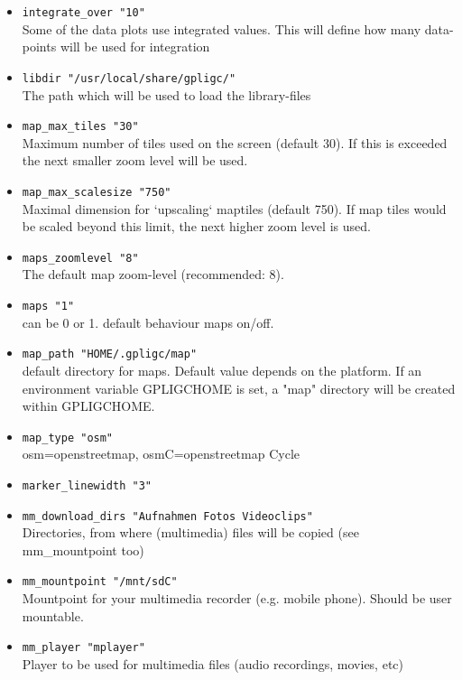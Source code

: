 \begin{itemize}
\item \texttt{integrate\_over    "10"}\\
    Some of the data plots use integrated values. This will define how many data-points will
    be used for  integration
\item \texttt{libdir    "/usr/local/share/gpligc/"}\\
    The path which will be used to load the library-files

\item \texttt{map\_max\_tiles "30"}\\ Maximum number of tiles used on the screen (default 30). If this is exceeded the next smaller zoom level will be used.
\item \texttt{map\_max\_scalesize "750"}\\ Maximal dimension for `upscaling` maptiles (default 750).
If map tiles would be scaled beyond this limit, the next higher zoom level is used.
\item \texttt{maps\_zoomlevel "8"}\\ The default map zoom-level (recommended: 8).
\item \texttt{maps "1"}\\ can be 0 or 1. default behaviour maps on/off.
\item \texttt{map\_path "HOME/.gpligc/map"}\\
default directory for maps. Default value depends on the platform.
If an environment variable GPLIGCHOME is set, a "map" directory will be created within GPLIGCHOME.

\item \texttt{map\_type "osm"}\\  osm=openstreetmap, osmC=openstreetmap Cycle

\item \texttt{marker\_linewidth    "3"}
\item \texttt{mm\_download\_dirs    "Aufnahmen Fotos Videoclips"}\\
	Directories, from where (multimedia) files will be copied (see mm\_mountpoint too)
\item \texttt{mm\_mountpoint    "/mnt/sdC"} \\
	Mountpoint for your multimedia recorder (e.g. mobile phone). Should be user mountable.
\item \texttt{mm\_player    "mplayer"} \\
	Player to be used for multimedia files (audio recordings, movies, etc)


\end{itemize}
